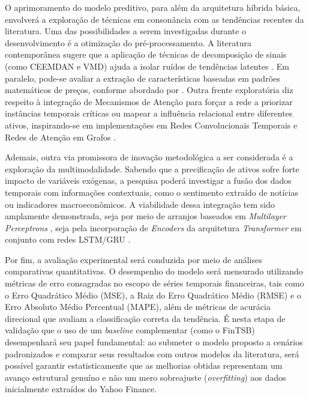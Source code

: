 \documentclass[12pt, a4paper, twoside]{article}
\begin{document}
O aprimoramento do modelo preditivo, para além da arquitetura híbrida básica, envolverá a exploração de técnicas em consonância com as tendências recentes da literatura. Uma das possibilidades a serem investigadas durante o desenvolvimento é a otimização do pré-processamento. A literatura contemporânea sugere que a aplicação de técnicas de decomposição de sinais (como CEEMDAN e VMD) ajuda a isolar ruídos de tendências latentes \cite{sun_novel_2024, li_accurate_2024}. Em paralelo, pode-se avaliar a extração de características baseadas em padrões matemáticos de preços, conforme abordado por . Outra frente exploratória diz respeito à integração de Mecanismos de Atenção para forçar a rede a priorizar instâncias temporais críticas ou mapear a influência relacional entre diferentes ativos, inspirando-se em implementações em Redes Convolucionais Temporais \cite{biswas_dual_2025} e Redes de Atenção em Grafos \cite{hsu_fingat_2023}.

Ademais, outra via promissora de inovação metodológica a ser considerada é a exploração da multimodalidade. Sabendo que a precificação de ativos sofre forte impacto de variáveis exógenas, a pesquisa poderá investigar a fusão dos dados temporais com informações contextuais, como o sentimento extraído de notícias ou indicadores macroeconômicos. A viabilidade dessa integração tem sido amplamente demonstrada, seja por meio de arranjos baseados em \textit{Multilayer Perceptrons} \cite{choi_hybrid_2023}, seja pela incorporação de \textit{Encoders} da arquitetura \textit{Transformer} em conjunto com redes LSTM/GRU \cite{wang_stock_2023, haryono_transformer-gated_2023}.

Por fim, a avaliação experimental será conduzida por meio de análises comparativas quantitativas. O desempenho do modelo será mensurado utilizando métricas de erro consagradas no escopo de séries temporais financeiras, tais como o Erro Quadrático Médio (MSE), a Raiz do Erro Quadrático Médio (RMSE) e o Erro Absoluto Médio Percentual (MAPE), além de métricas de acurácia direcional que avaliam a classificação correta da tendência. É nesta etapa de validação que o uso de um \textit{baseline} complementar (como o FinTSB) desempenhará seu papel fundamental: ao submeter o modelo proposto a cenários padronizados e comparar seus resultados com outros modelos da literatura, será possível garantir estatisticamente que as melhorias obtidas representam um avanço estrutural genuíno e não um mero sobreajuste (\textit{overfitting}) aos dados inicialmente extraídos do Yahoo Finance.
\end{document}

